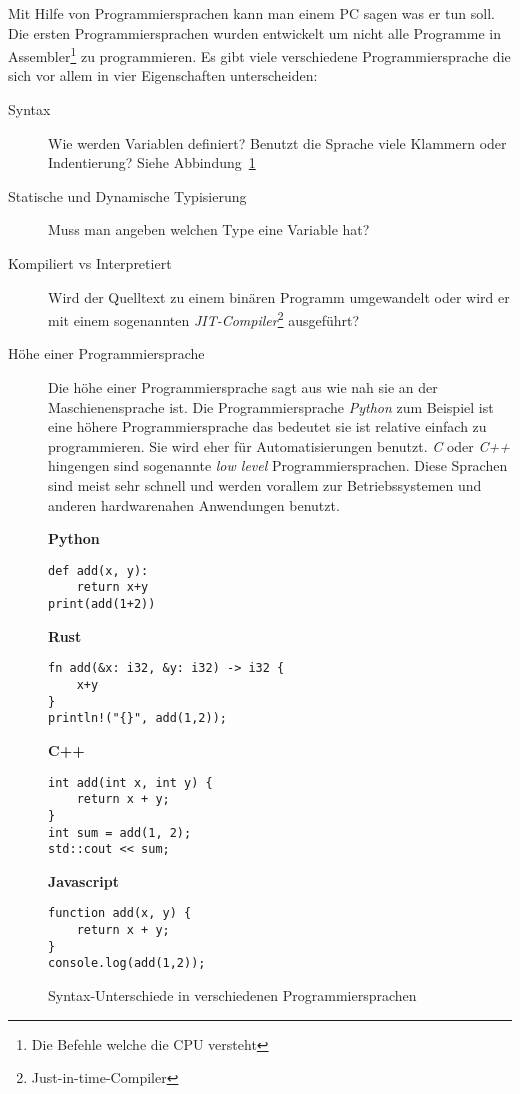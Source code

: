 \documentclass[a4paper, ngerman, 12pt]{scrartcl}
\begin{document}
Mit Hilfe von Programmiersprachen kann man einem PC sagen was er tun soll.
Die ersten Programmiersprachen wurden entwickelt um nicht alle Programme in Assembler\footnote{Die Befehle welche die CPU versteht} zu programmieren.
Es gibt viele verschiedene Programmiersprache die sich vor allem in vier Eigenschaften unterscheiden:

\begin{description}
	\item[Syntax] Wie werden Variablen definiert? Benutzt die Sprache viele Klammern oder Indentierung? Siehe Abbindung~\ref{abb:syntax}
	\item[Statische und Dynamische Typisierung] Muss man angeben welchen Type eine Variable hat?
	\item[Kompiliert vs Interpretiert] Wird der Quelltext zu einem binären Programm umgewandelt oder wird er mit einem sogenannten \textit{JIT-Compiler}\footnote{Just-in-time-Compiler} ausgeführt?
	\item[Höhe einer Programmiersprache] Die höhe einer Programmiersprache sagt aus wie nah sie an der Maschienensprache ist. Die Programmiersprache \emph{Python} zum Beispiel ist eine höhere Programmiersprache das bedeutet sie ist relative einfach zu programmieren. Sie wird eher für Automatisierungen benutzt. \emph{C} oder \emph{C++} hingengen sind sogenannte \emph{low level} Programmiersprachen. Diese Sprachen sind meist sehr schnell und werden vorallem zur Betriebssystemen und anderen hardwarenahen Anwendungen benutzt.
\end{description}

\begin{figure}[ht]
\begin{minipage}{0.5\textwidth}
\textbf{Python}
\begin{verbatim}
def add(x, y):
	return x+y
print(add(1+2))
\end{verbatim}

\end{minipage}
\begin{minipage}{0.5\textwidth}
\textbf{Rust}
\begin{verbatim}
fn add(&x: i32, &y: i32) -> i32 {
	x+y
}
println!("{}", add(1,2));
\end{verbatim}
\end{minipage}
\begin{minipage}{0.5\textwidth}

\textbf{C++}

\begin{verbatim}
int add(int x, int y) {
	return x + y;
}
int sum = add(1, 2);
std::cout << sum;
\end{verbatim}
\end{minipage}
\begin{minipage}{0.5\textwidth}
\textbf{Javascript}
\begin{verbatim}
function add(x, y) {
	return x + y;
}
console.log(add(1,2));
\end{verbatim}
\end{minipage}

\caption{Syntax-Unterschiede in verschiedenen Programmiersprachen\label{abb:syntax}}
\end{figure}
\end{document}
